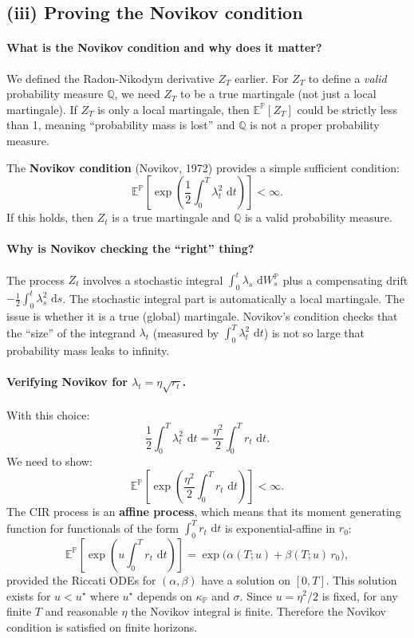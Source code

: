 \documentclass[11pt]{article}
\newcommand{\PP}{\mathbb{P}}
\newcommand{\QQ}{\mathbb{Q}}
\newcommand{\EE}{\mathbb{E}}
\newcommand{\dd}{\,\mathrm{d}}
\begin{document}
\subsection{(iii) Proving the Novikov condition}

\paragraph{What is the Novikov condition and why does it matter?}
We defined the Radon-Nikodym derivative $Z_T$ earlier.  For $Z_T$ to
define a \emph{valid} probability measure $\QQ$, we need $Z_T$ to be a
true martingale (not just a local martingale).  If $Z_T$ is only a local
martingale, then $\EE^\PP[Z_T]$ could be strictly less than 1, meaning
``probability mass is lost'' and $\QQ$ is not a proper probability measure.

The \textbf{Novikov condition} (Novikov, 1972) provides a simple sufficient
condition:
\[
\EE^\PP\!\left[\exp\!\left(\frac{1}{2}\int_0^T \lambda_t^2\,\dd t\right)\right]
< \infty.
\]
If this holds, then $Z_t$ is a true martingale and $\QQ$ is a valid
probability measure.

\paragraph{Why is Novikov checking the ``right'' thing?}
The process $Z_t$ involves a stochastic integral $\int_0^t \lambda_s\,\dd W_s^\PP$
plus a compensating drift $-\frac{1}{2}\int_0^t\lambda_s^2\,\dd s$.
The stochastic integral part is automatically a local martingale.  The
issue is whether it is a true (global) martingale.  Novikov's condition
checks that the ``size'' of the integrand $\lambda_t$ (measured by
$\int_0^T\lambda_t^2\,\dd t$) is not so large that probability mass leaks
to infinity.

\paragraph{Verifying Novikov for $\lambda_t = \eta\sqrt{r_t}$.}
With this choice:
\[
\frac{1}{2}\int_0^T \lambda_t^2\,\dd t
= \frac{\eta^2}{2}\int_0^T r_t\,\dd t.
\]
We need to show:
\[
\EE^\PP\!\left[\exp\!\left(\frac{\eta^2}{2}\int_0^T r_t\,\dd t\right)\right]
< \infty.
\]
The CIR process is an \textbf{affine process}, which means that its moment
generating function for functionals of the form $\int_0^T r_t\,\dd t$ is
exponential-affine in $r_0$:
\[
\EE^\PP\!\left[\exp\!\left(u\int_0^T r_t\,\dd t\right)\right]
= \exp\!\big(\alpha(T;u) + \beta(T;u)\,r_0\big),
\]
provided the Riccati ODEs for $(\alpha,\beta)$ have a solution on $[0,T]$.
This solution exists for $u < u^\star$ where $u^\star$ depends on $\kappa_\PP$
and $\sigma$.  Since $u = \eta^2/2$ is fixed, for any finite $T$ and
reasonable $\eta$ the Novikov integral is finite.  Therefore the Novikov
condition is satisfied on finite horizons.
\end{document}
